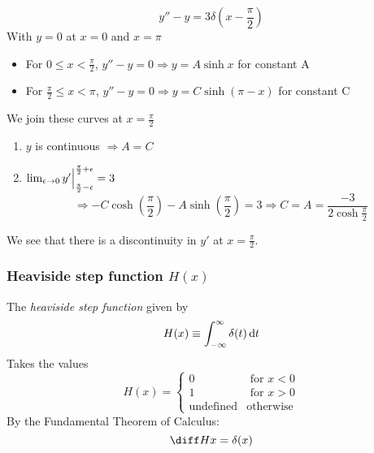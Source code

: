 \documentclass{article}
\begin{document}
\begin{eg}
    \[
        y'' - y = 3 \delta(x - \frac{\pi}{2})  
    \]
    With $y = 0$ at $x = 0$ and $x = \pi$
    \begin{itemize}
        \item For $0 \leq x < \frac{\pi}{2}$, $y'' - y = 0 \Rightarrow y = A \sinh x$ for constant A
        \item For $\frac{\pi}{2} \leq x < \pi$, $y'' - y = 0 \Rightarrow y = C \sinh (\pi - x)$ for constant C
    \end{itemize}
    We join these curves at $x = \frac{\pi}{2}$
    \begin{enumerate}
        \item $y$ is continuous $\Rightarrow A = C$
        \item $\lim_{\epsilon \rightarrow 0} y' \Big{|}_{\frac{\pi}{2} - \epsilon}^{\frac{\pi}{2} + \epsilon} = 3$
        \[
            \Rightarrow -C \cosh(\frac{\pi}{2}) - A \sinh(\frac{\pi}{2}) = 3 \Rightarrow C = A = \frac{-3}{2 \cosh{\frac{\pi}{2}}} 
        \]
    \end{enumerate}

    \begin{center}
    \end{center}

    We see that there is a discontinuity in $y'$ at $x = \frac{\pi}{2}$.
\end{eg}
\subsubsection{Heaviside step function $H(x)$}
\begin{defi}
    The \emph{heaviside step function} given by
    \[
        H(x) \equiv \int_{-\infty}^{\infty} {\delta(t) \mathop{}\!\mathrm{d} t} 
    \]
    Takes the values
    \[
        H(x) = \begin{cases}
            0 & \text{ for } x < 0 \\
            1 & \text{ for } x > 0 \\
            \text{undefined} & \text{otherwise}
        \end{cases}
    \]  
    By the Fundamental Theorem of Calculus:
    \[
        \diff Hx = \delta(x)
    \]
\end{defi}

\end{document}
